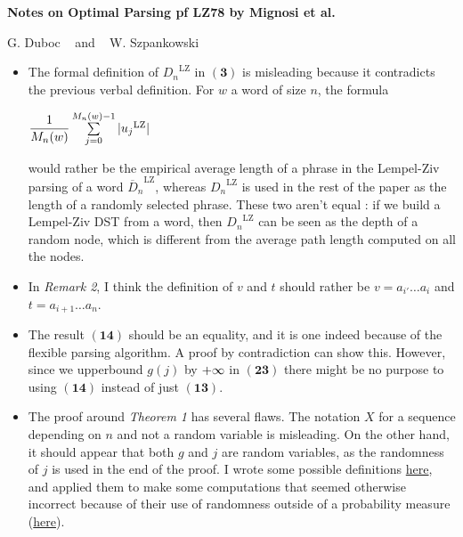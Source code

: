 \documentclass[11pt]{article}
\newcommand{\question}[2][3]{%
	{\centering%
	\noindent\fbox{\bfseries#2}}\raggedright}%
\newcommand{\numero}[1]{\mathbf{(#1)}}
\newcommand{\centers}[2][2]{
    \begin{center}
    {#2}\end{center}}
\newcommand{\f}[2]{{
	\mathchoice%
		{\dfrac{#1}{#2}}
    	{\dfrac{#1}{#2}}
		{\frac{#1}{#2}}
		{\frac{#1}{#2}}
}}
\newcommand\Sum[2]{\textstyle\sum\limits_{#1}^{#2}}
\newcommand{\pinf}{\tiny{+}\infty}
\def\parsec{\par\noindent}
\def\big{\bigskip\parsec}
\begin{document}
\begin{center}
{\LARGE {\bf Notes on Optimal Parsing pf LZ78 by Mignosi et al.}}
\big
G. Duboc ~ and ~ W. Szpankowski
\end{center}

\question{Corrections}

\begin{itemize}

\item The formal definition of ${D_n}^{\text{LZ}}$ in $\numero{3}$ is 
      misleading because it contradicts the previous verbal definition.
      For $w$ a word of size $n$, the formula
      \centers{$ \f{1}{M_n(w)} \Sum{j=0}{M_n(w)-1} |{u_j}^{\text{LZ}}|$}
      would rather be the empirical average length of a phrase in the Lempel-Ziv
      parsing of a word ${\overline D_n}^{\text{LZ}}$, whereas
      ${D_n}^{\text{LZ}}$ is used in the rest of the paper as the length
      of a randomly selected phrase. These two aren't equal :
      if we build a Lempel-Ziv DST from a word, then 
      ${D_n}^{\text{LZ}}$ can be seen as the depth of a random node, 
      which is different from the average path length computed 
      on all the nodes. 

\item In \emph{Remark 2}, I think the definition of $v$ and 
      $t$ should rather be 
      $ v = a_{i'} \dots a_{i} $ and
      $ t = a_{i+1} \dots a_n$. 

\item The result $\numero{14}$ should be an equality, and it is one indeed
      because of the flexible parsing algorithm. A proof by contradiction
      can show this. However, since we upperbound $g(j)$ by $\pinf$ in 
      $\numero{23}$ there might be no purpose to using $\numero{14}$ 
      instead of just $\numero{13}$. 

\item The proof around \emph{Theorem 1} has several flaws.
      The notation $X$ for a sequence depending on $n$ and not a 
      random variable is misleading. On the other hand, it should appear
      that both $g$ and $j$ are random variables, as the randomness of 
      $j$ is used in the end of the proof.
      I wrote some possible definitions \hyperlink{definitions}{here},
      and applied them to make some computations that seemed otherwise
      incorrect because of their use of randomness outside of a probability
      measure (\hyperlink{computations}{here}).


\end{itemize}
\end{document}

